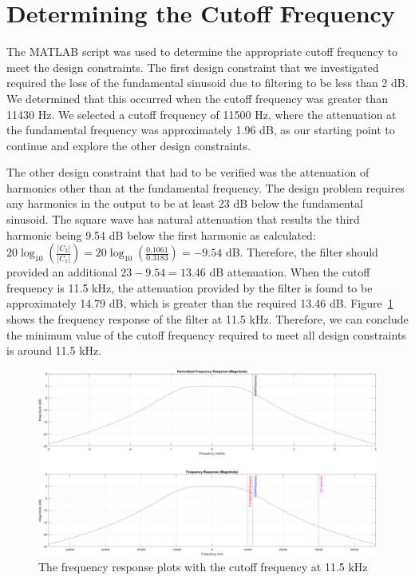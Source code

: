 \documentclass[12pt]{article}
\begin{document}
\section*{Determining the Cutoff Frequency}
The MATLAB script was used to determine the appropriate cutoff frequency to meet the design constraints. The first design constraint that we investigated required the loss of the fundamental sinusoid due to filtering to be less than 2 dB. We determined that this occurred when the cutoff frequency was greater than 11430 Hz. We selected a cutoff frequency of 11500 Hz, where the attenuation at the fundamental frequency was approximately 1.96 dB, as our starting point to continue and explore the other design constraints.

The other design constraint that had to be verified was the attenuation of harmonics other than at the fundamental frequency. The design problem requires any harmonics in the output to be at least 23 dB below the fundamental sinusoid. The square wave has natural attenuation that results the third harmonic being 9.54 dB below the first harmonic as calculated: $20\log_{10}\left(\frac{|C_3|}{|C_1|}\right) = 20\log_{10}\left(\frac{0.1061}{0.3183}\right) = -9.54$ dB. Therefore, the filter should provided an additional $23 - 9.54  = 13.46$ dB attenuation. When the cutoff frequency is 11.5 kHz, the attenuation provided by the filter is found to be approximately 14.79 dB, which is greater than the required 13.46 dB. Figure~\ref{fig:freq_response} shows the frequency response of the filter at 11.5 kHz. Therefore, we can conclude the minimum value of the cutoff frequency required to meet all design constraints is around 11.5 kHz.
\begin{figure}[h!]
    \includegraphics[width=\textwidth]{frequency_response.png}
    \caption{\label{fig:freq_response} The frequency response plots with the cutoff frequency at 11.5 kHz}
\end{figure}
\end{document}
